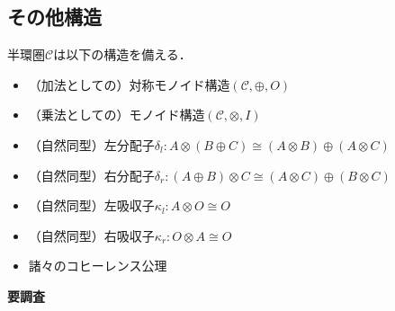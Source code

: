 \documentclass[type_judgement.tex]{subfiles}
\begin{document}
\subsection{その他構造}
\begin{defn}
半環圏$\mathcal{C}$は以下の構造を備える．
\begin{itemize}
    \item （加法としての）対称モノイド構造$(\mathcal{C},\oplus,O)$
    \item （乗法としての）モノイド構造$(\mathcal{C},\otimes,I)$
    \item （自然同型）左分配子$\delta_l:A \otimes (B \oplus C) \cong (A \otimes B) \oplus (A \otimes C)$
    \item （自然同型）右分配子$\delta_r:(A \oplus B) \otimes C \cong (A \otimes C) \oplus (B \otimes C)$
    \item （自然同型）左吸収子$\kappa_l:A \otimes O \cong O$
    \item （自然同型）右吸収子$\kappa_r:O \otimes A \cong O$
    \item 諸々のコヒーレンス公理\cite{laplaza72}
\end{itemize}
\end{defn}

\begin{defn}{\bf 要調査}
\end{defn}





\end{document}
